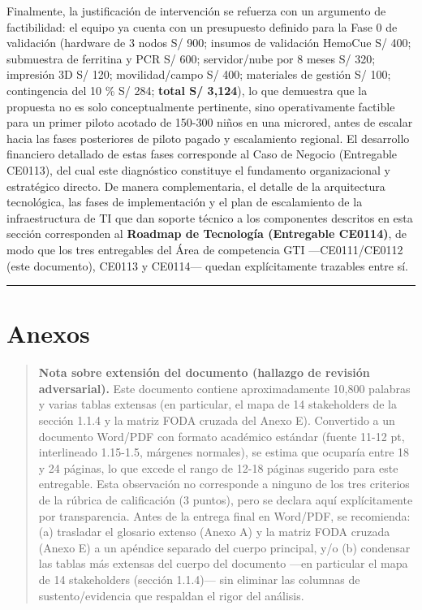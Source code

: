 \documentclass[11pt,a4paper]{article}
\begin{document}
Finalmente, la justificación de intervención se refuerza con un argumento de factibilidad: el equipo ya cuenta con un presupuesto definido para la Fase 0 de validación (hardware de 3 nodos S/ 900; insumos de validación HemoCue S/ 400; submuestra de ferritina y PCR S/ 600; servidor/nube por 8 meses S/ 320; impresión 3D S/ 120; movilidad/campo S/ 400; materiales de gestión S/ 100; contingencia del 10 \% S/ 284; \textbf{total S/ 3,124}), lo que demuestra que la propuesta no es solo conceptualmente pertinente, sino operativamente factible para un primer piloto acotado de 150-300 niños en una microred, antes de escalar hacia las fases posteriores de piloto pagado y escalamiento regional. El desarrollo financiero detallado de estas fases corresponde al Caso de Negocio (Entregable CE0113), del cual este diagnóstico constituye el fundamento organizacional y estratégico directo. De manera complementaria, el detalle de la arquitectura tecnológica, las fases de implementación y el plan de escalamiento de la infraestructura de TI que dan soporte técnico a los componentes descritos en esta sección corresponden al \textbf{Roadmap de Tecnología (Entregable CE0114)}, de modo que los tres entregables del Área de competencia GTI ---CE0111/CE0112 (este documento), CE0113 y CE0114--- quedan explícitamente trazables entre sí.

\begin{center}\rule{0.5\linewidth}{0.5pt}\end{center}

\section{Anexos}\label{anexos}

\begin{quote}
\textbf{Nota sobre extensión del documento (hallazgo de revisión adversarial).} Este documento contiene aproximadamente 10,800 palabras y varias tablas extensas (en particular, el mapa de 14 stakeholders de la sección 1.1.4 y la matriz FODA cruzada del Anexo E). Convertido a un documento Word/PDF con formato académico estándar (fuente 11-12 pt, interlineado 1.15-1.5, márgenes normales), se estima que ocuparía entre 18 y 24 páginas, lo que excede el rango de 12-18 páginas sugerido para este entregable. Esta observación no corresponde a ninguno de los tres criterios de la rúbrica de calificación (3 puntos), pero se declara aquí explícitamente por transparencia. Antes de la entrega final en Word/PDF, se recomienda: (a) trasladar el glosario extenso (Anexo A) y la matriz FODA cruzada (Anexo E) a un apéndice separado del cuerpo principal, y/o (b) condensar las tablas más extensas del cuerpo del documento ---en particular el mapa de 14 stakeholders (sección 1.1.4)--- sin eliminar las columnas de sustento/evidencia que respaldan el rigor del análisis.
\end{quote}
\end{document}

